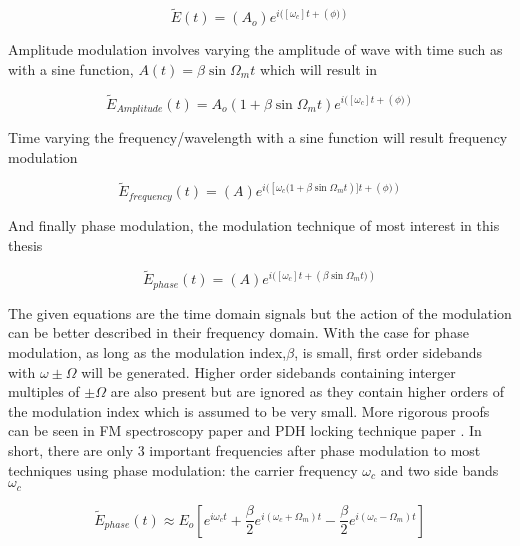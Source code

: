\documentclass[a4paper]{book}
\begin{document}
			\begin{equation}
				\tilde{E}(t)=\left(A_o\right)e^{i(\left[\omega_c\right] t + \left(\phi)\right)}
			\end{equation}
			
			Amplitude modulation involves varying the amplitude of wave with time such as with a sine function, $A(t)=\beta \sin{\Omega_m t}$ which will result in
			
			\begin{equation}
				\tilde{E}_{Amplitude}(t)=A_o\left(1+\beta \sin{\Omega_m t}\right) e^{i(\left[\omega_c\right] t + \left(\phi)\right)}
			\end{equation}
			
			Time varying the frequency/wavelength with a sine function will result frequency modulation
			
			\begin{equation}
				\tilde{E}_{frequency}(t)=\left(A\right) e^{i(\left[\omega_c (1+\beta \sin{\Omega_m t}\right)] t + \left(\phi)\right)}
			\end{equation}
			
			And finally phase modulation, the modulation technique of most interest in this thesis
			
			\begin{equation}
				\tilde{E}_{phase}(t)=\left(A\right)e^{i(\left[\omega_c \right] t + \left(\beta \sin{\Omega_m t})\right)}
			\end{equation}	
				
			The given equations are the time domain signals but the action of the modulation can be better described in their frequency domain. With the case for phase modulation, as long as the modulation index,$\beta$, is small, first order sidebands with $\omega \pm \Omega $ will be generated. Higher order sidebands containing interger multiples of $\pm \Omega$ are also present but are ignored as they contain higher orders of the modulation index which is assumed to be very small. More rigorous proofs can be seen in FM spectroscopy paper \cite{FMspec} and PDH locking technique paper \cite{PDH Intro}. In short, there are only 3 important frequencies after phase modulation to most techniques using phase modulation: the carrier frequency $\omega_c$ and two side bands $\omega_c$ 
			
			\begin{equation}
				\tilde{E}_{phase}(t)\approx E_o [e^{i\omega_c t}   +   \dfrac{\beta}{2} e^{i(\omega_c +\Omega_m)t}  -  \dfrac{\beta}{2} e^{i(\omega_c -\Omega_m)t}]
			\end{equation}
			
\end{document}
